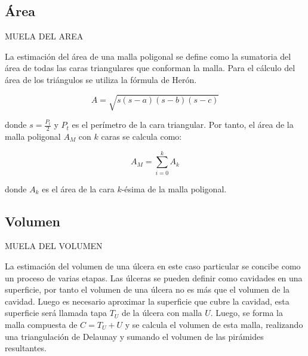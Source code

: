 \subsection{Área}

MUELA DEL AREA

La estimación del área de una malla poligonal se define como la sumatoria del área de todas las caras triangulares que conforman la malla. Para el cálculo del área de los triángulos se utiliza la fórmula de Herón. 

$$A = \sqrt{s(s-a)(s-b)(s-c)}$$

donde $s = \frac{P_t}{2}$ y $P_t$ es el perímetro de la cara triangular. Por tanto, el área de la malla poligonal $A_M$ con $k$ caras se calcula como:

\begin{equation}
	A_M = \sum_{i = 0}^{k} A_k
\end{equation}

donde $A_k$ es el área de la cara $k$-ésima de la malla poligonal.

\subsection{Volumen}

MUELA DEL VOLUMEN

La estimación del volumen de una úlcera en este caso particular se concibe como un proceso de varias etapas. Las úlceras se pueden definir como cavidades en una superficie, por tanto el volumen de una úlcera no es más que el volumen de la cavidad. Luego es necesario aproximar la superficie que cubre la cavidad, esta superficie será llamada tapa $T_U$ de la úlcera con malla $U$. Luego, se forma la malla compuesta de $C = T_U + U$ y se calcula el volumen de esta malla, realizando una triangulación de Delaunay y sumando el volumen de las pirámides resultantes.


